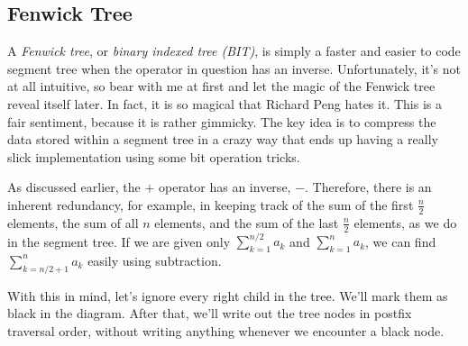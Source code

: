 \documentclass[11pt]{book}
\begin{document}
\subsection{Fenwick Tree}

A \textit{Fenwick tree}, or \textit{binary indexed tree (BIT)}, is simply a faster and easier to code segment tree when the operator in question has an inverse. Unfortunately, it's not at all intuitive, so bear with me at first and let the magic of the Fenwick tree reveal itself later. In fact, it is so magical that Richard Peng hates it. This is a fair sentiment, because it is rather gimmicky. The key idea is to compress the data stored within a segment tree in a crazy way that ends up having a really slick implementation using some bit operation tricks.

As discussed earlier, the $+$ operator has an inverse, $-$. Therefore, there is an inherent redundancy, for example, in keeping track of the sum of the first $\frac{n}{2}$ elements, the sum of all $n$ elements, and the sum of the last $\frac{n}{2}$ elements, as we do in the segment tree. If we are given only $\sum_{k=1}^{n/2} a_k$ and $\sum_{k=1}^n a_k$, we can find $\sum_{k=n/2+1}^{n} a_k$ easily using subtraction.

With this in mind, let's ignore every right child in the tree. We'll mark them as black in the diagram. After that, we'll write out the tree nodes in postfix traversal order, without writing anything whenever we encounter a black node.
\end{document}
